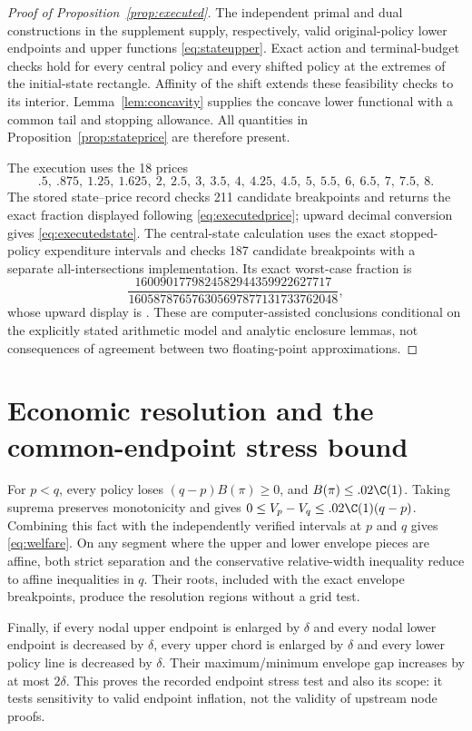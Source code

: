 \begin{proof}[Proof of Proposition~\ref{prop:executed}]
The independent primal and dual constructions in the supplement supply, respectively, valid original-policy lower endpoints and upper functions \eqref{eq:stateupper}. Exact action and terminal-budget checks hold for every central policy and every shifted policy at the extremes of the initial-state rectangle. Affinity of the shift extends these feasibility checks to its interior. Lemma~\ref{lem:concavity} supplies the concave lower functional with a common tail and stopping allowance. All quantities in Proposition~\ref{prop:stateprice} are therefore present.

The execution uses the 18 prices
\[
 .5,\ .875,\ 1.25,\ 1.625,\ 2,\ 2.5,\ 3,\ 3.5,\ 4,\ 4.25,
 \ 4.5,\ 5,\ 5.5,\ 6,\ 6.5,\ 7,\ 7.5,\ 8.
\]
The stored state--price record checks 211 candidate breakpoints and returns the exact fraction displayed following \eqref{eq:executedprice}; upward decimal conversion gives \eqref{eq:executedstate}. The central-state calculation uses the exact stopped-policy expenditure intervals and checks 187 candidate breakpoints with a separate all-intersections implementation. Its exact worst-case fraction is
\[
 \frac{1600901779824582944359922627717}{160587876576305697877131733762048},
\]
whose upward display is \pricebound. These are computer-assisted conclusions conditional on the explicitly stated arithmetic model and analytic enclosure lemmas, not consequences of agreement between two floating-point approximations.
\end{proof}

\section{Economic resolution and the common-endpoint stress bound}
For $p<q$, every policy loses $(q-p)B(\pi)\geq0$, and $B(\pi)\leq .02\C(1)$. Taking suprema preserves monotonicity and gives
$0\leq V_p-V_q\leq .02\C(1)(q-p)$.
Combining this fact with the independently verified intervals at $p$ and $q$ gives \eqref{eq:welfare}. On any segment where the upper and lower envelope pieces are affine, both strict separation and the conservative relative-width inequality reduce to affine inequalities in $q$. Their roots, included with the exact envelope breakpoints, produce the resolution regions without a grid test.

Finally, if every nodal upper endpoint is enlarged by $\delta$ and every nodal lower endpoint is decreased by $\delta$, every upper chord is enlarged by $\delta$ and every lower policy line is decreased by $\delta$. Their maximum/minimum envelope gap increases by at most $2\delta$. This proves the recorded endpoint stress test and also its scope: it tests sensitivity to valid endpoint inflation, not the validity of upstream node proofs.

